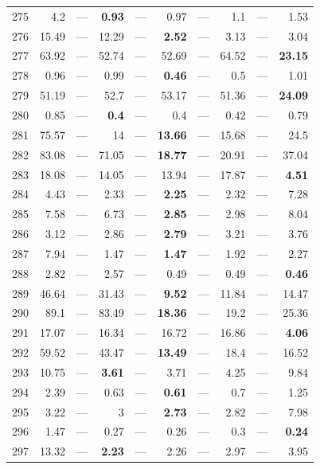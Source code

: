 \begin{longtable}{lr@{\hskip 4pt}l@{\hskip 12pt}r@{\hskip 4pt}l@{\hskip 12pt}r@{\hskip 4pt}l@{\hskip 12pt}r@{\hskip 4pt}l@{\hskip 12pt}r}
275 & 4.2 & --- & \textbf{0.93} & --- & 0.97 & --- & 1.1 & --- & 1.53 \\
276 & 15.49 & --- & 12.29 & --- & \textbf{2.52} & --- & 3.13 & --- & 3.04 \\
277 & 63.92 & --- & 52.74 & --- & 52.69 & --- & 64.52 & --- & \textbf{23.15} \\
278 & 0.96 & --- & 0.99 & --- & \textbf{0.46} & --- & 0.5 & --- & 1.01 \\
279 & 51.19 & --- & 52.7 & --- & 53.17 & --- & 51.36 & --- & \textbf{24.09} \\
280 & 0.85 & --- & \textbf{0.4} & --- & 0.4 & --- & 0.42 & --- & 0.79 \\
281 & 75.57 & --- & 14 & --- & \textbf{13.66} & --- & 15.68 & --- & 24.5 \\
282 & 83.08 & --- & 71.05 & --- & \textbf{18.77} & --- & 20.91 & --- & 37.04 \\
283 & 18.08 & --- & 14.05 & --- & 13.94 & --- & 17.87 & --- & \textbf{4.51} \\
284 & 4.43 & --- & 2.33 & --- & \textbf{2.25} & --- & 2.32 & --- & 7.28 \\
285 & 7.58 & --- & 6.73 & --- & \textbf{2.85} & --- & 2.98 & --- & 8.04 \\
286 & 3.12 & --- & 2.86 & --- & \textbf{2.79} & --- & 3.21 & --- & 3.76 \\
287 & 7.94 & --- & 1.47 & --- & \textbf{1.47} & --- & 1.92 & --- & 2.27 \\
288 & 2.82 & --- & 2.57 & --- & 0.49 & --- & 0.49 & --- & \textbf{0.46} \\
289 & 46.64 & --- & 31.43 & --- & \textbf{9.52} & --- & 11.84 & --- & 14.47 \\
290 & 89.1 & --- & 83.49 & --- & \textbf{18.36} & --- & 19.2 & --- & 25.36 \\
291 & 17.07 & --- & 16.34 & --- & 16.72 & --- & 16.86 & --- & \textbf{4.06} \\
292 & 59.52 & --- & 43.47 & --- & \textbf{13.49} & --- & 18.4 & --- & 16.52 \\
293 & 10.75 & --- & \textbf{3.61} & --- & 3.71 & --- & 4.25 & --- & 9.84 \\
294 & 2.39 & --- & 0.63 & --- & \textbf{0.61} & --- & 0.7 & --- & 1.25 \\
295 & 3.22 & --- & 3 & --- & \textbf{2.73} & --- & 2.82 & --- & 7.98 \\
296 & 1.47 & --- & 0.27 & --- & 0.26 & --- & 0.3 & --- & \textbf{0.24} \\
297 & 13.32 & --- & \textbf{2.23} & --- & 2.26 & --- & 2.97 & --- & 3.95 \\

\end{longtable}
